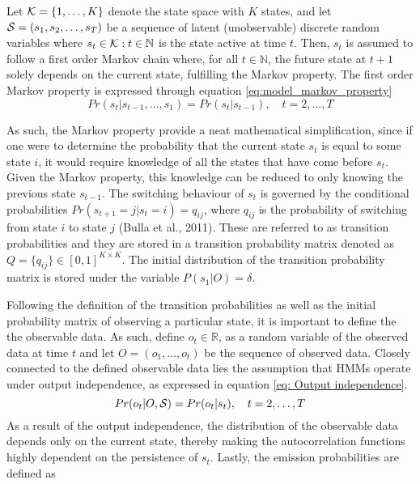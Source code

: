 Let $\K=\{ 1,\ldots, K \}$ denote the state space with $K$ states, and let $\S=(s_1,s_2,\ldots,s_T)$ be a sequence of latent (unobservable) discrete random variables where $s_t\in\K: t\in \mathbb{N}$ is the state active at time $t$. Then, $s_t$ is assumed to follow a first order Markov chain where, for all $t \in \mathbb{N}$, the future state at $t + 1$ solely depends on the current state, fulfilling the Markov property. The first order Markov property is expressed through equation \ref{eq:model_markov_property}
\begin{equation}
    Pr(s_t | s_{t-1},\ldots,s_1) = Pr(s_t | s_{t-1}),
    \quad t=2,\ldots,T
    \label{eq:model_markov_property}
\end{equation} 

As such, the Markov property provide a neat mathematical simplification, since if one were to determine the probability that the current state $s_t$ is equal to some state $i$, it would require knowledge of all the states that have come before $s_t$. Given the Markov property, this knowledge can be reduced to only knowing the previous state $s_{t-1}$. The switching behaviour of $s_t$ is governed by the conditional probabilities $Pr(s_{t+1} = j| s_t = i) = q_{ij}$, where $q_{ij}$ is the probability of switching from state $i$ to state $j$ (Bulla et al., 2011). These are referred to as transition probabilities and they are stored in a transition probability matrix denoted as $Q = \{q_{ij}\} \in [0,1]^{K \times K}$. The initial distribution of the transition probability matrix is stored under the variable $P(s_1|O)= \delta$.

Following the definition of the transition probabilities as well as the initial probability matrix of observing a particular state, it is important to define the the observable data. As such, define $o_t \in \mathbb{R}$, as a random variable of the observed data at time $t$ and let $O=(o_1,\ldots,o_t)$ be the sequence of observed data. Closely connected to the defined observable data lies the assumption that HMMs operate under output independence, as expressed in equation \ref{eq: Output independence}.
\begin{equation}
    Pr(o_t|O, \S) = Pr(o_t|s_t),
    \quad t=2,\ldots,T
    \label{eq: Output independence}
\end{equation}
As a result of the output independence, the distribution of the observable data depends only on the current state, thereby making the autocorrelation functions highly dependent on the persistence of $s_t$. Lastly, the emission probabilities are defined as

